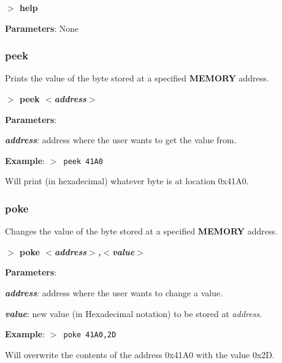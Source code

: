 \documentclass[a4paper,11pt]{article}
\begin{document}
        \hspace{1.9cm}\textbf{$>$ help}

        \textbf{Parameters}: None

        \subsubsection{{\color{blue}peek}}
        Prints the value of the byte stored at a specified \textbf{MEMORY}
        address.

        \hspace{1.9cm}\textbf{$>$ peek \textit{$<$address$>$}}

        \textbf{Parameters}:

        \hspace{1cm}\textbf{\textit{address}}: address where the user wants
        to get the value from.

        \textbf{Example}: \texttt{$>$ peek 41A0}

        Will print (in hexadecimal) whatever byte is at location 0x41A0.

        \subsubsection{{\color{blue}poke}}
        Changes the value of the byte stored at a specified \textbf{MEMORY}
        address.

        \hspace{1.9cm}\textbf{$>$ poke \textit{$<$address$>$,$<$value$>$}}

        \textbf{Parameters}:

        \hspace{1cm}\textbf{\textit{address}}: address where the user wants
        to change a value.
        
        \hspace{1cm}\textbf{\textit{value}}: new value (in Hexadecimal notation)
        to be stored at \textit{address}.

        \textbf{Example}: \texttt{$>$ poke 41A0,2D}

        Will overwrite the contents of the address 0x41A0 with the value
        0x2D.
\end{document}
